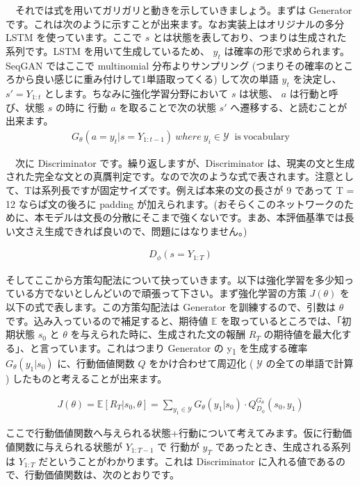\documentclass[a4paper, dvipdfmx, 10pt]{article}
\begin{document}
　それでは式を用いてガリガリと動きを示していきましょう。まずは Generator です。これは次のように示すことが出来ます。なお実装上はオリジナルの多分 LSTM を使っています。ここで \(s\) とは状態を表しており、つまりは生成された系列です。LSTM を用いて生成しているため、 \(y_t\) は確率の形で求められます。 SeqGAN ではここで multinomial 分布よりサンプリング (つまりその確率のところから良い感じに重み付けして1単語取ってくる) して次の単語 \(y_t\) を決定し、 \(s'=Y_{1:t}\) とします。ちなみに強化学習分野において \(s\) は状態、 \(a\) は行動と呼び、状態 \(s\) の時に 行動 \(a\) を取ることで次の状態 \(s'\) へ遷移する、と読むことが出来ます。
\begin{eqnarray}
G_{\theta} (a = y_t | s = Y_{1:t-1}) \ where\ y_i \in \mathcal{Y}\ \text{ is} \ \text{vocabulary}
\end{eqnarray}

　次に Discriminator です。繰り返しますが、Discriminator は、現実の文と生成された完全な文との真贋判定です。なので次のような式で表されます。注意として、Tは系列長ですが固定サイズです。例えば本来の文の長さが 9 であって T = 12 ならば文の後ろに padding が加えられます。(おそらくこのネットワークのために、本モデルは文長の分散にそこまで強くないです。まあ、本評価基準では長い文さえ生成できれば良いので、問題にはなりません。)

\begin{eqnarray}
D_{\phi} (s = Y_{1:T})
\end{eqnarray}

そしてここから方策勾配法について抉っていきます。以下は強化学習を多少知っている方でないとしんどいので頑張って下さい。まず強化学習の方策 \(J(\theta)\) を以下の式で表します。この方策勾配法は Generator を訓練するので、引数は \(\theta\) です。込み入っているので補足すると、期待値 \(\mathbb{E}\) を取っているところでは、「初期状態 \(s_0\) と \(\theta\) を与えられた時に、生成された文の報酬 \(R_T\) の期待値を最大化する」、と言っています。これはつまり Generator の y\textsubscript{1} を生成する確率 \(G_{\theta}(y_1|s_0)\) に、行動価値関数 \(Q\) をかけ合わせて周辺化 ( \(\mathcal{Y}\) の全ての単語で計算 ) したものと考えることが出来ます。

\begin{eqnarray}
J(\theta) = \mathbb{E}[R_T | s_0, \theta] = \sum_{y_1 \in \mathcal{Y}} G_{\theta}(y_1 | s_0) \cdot Q^{G_{\theta}}_{D_{\phi}}(s_0, y_1)
\end{eqnarray}

ここで行動価値関数へ与えられる状態+行動について考えてみます。仮に行動価値関数に与えられる状態が \(Y_{1:T-1}\) で 行動が \(y_T\) であったとき、生成される系列は \(Y_{1:T}\) だということがわかります。これは Discriminator に入れる値であるので、行動価値関数は、次のとおりです。
\end{document}
